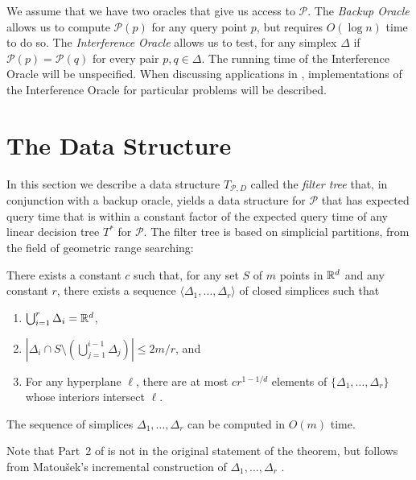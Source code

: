 \documentclass{patmorin}
\begin{document}
We assume that we have two oracles that give us access to $\mathcal{P}$.
The \emph{Backup Oracle} allows us to compute $\mathcal{P}(p)$ for
any query point $p$, but requires $O(\log n)$ time to do so.  The
\emph{Interference Oracle} allows us to test, for any simplex $\Delta$
if $\mathcal{P}(p)=\mathcal{P}(q)$ for every pair $p,q\in\Delta$.
The running time of the Interference Oracle will be unspecified.
When discussing applications in , implementations
of the Interference Oracle for particular problems will be described.

\section{The Data Structure}

In this section we describe a data structure $T_{\mathcal{P},D}$ called
the \emph{filter tree} that, in conjunction with a backup oracle, yields
a data structure for $\mathcal{P}$ that has expected query time that
is within a constant factor of the expected query time of any linear
decision tree $T^*$ for $\mathcal{P}$.  The filter tree is based on
simplicial partitions, from the field of geometric range searching:

\begin{thm}[Matou\v{s}ek 1992]
There exists a constant $c$ such that, for any set $S$ of $m$
points in $\mathbb{R}^d$ and any constant $r$, there exists a sequence
$\langle \Delta_1,\ldots,\Delta_r\rangle$ of closed simplices such that
  \begin{enumerate}
    \item $\bigcup_{i=1}^r \Delta_i = \mathbb{R}^d$,
    \item $\left|\Delta_i \cap S\setminus
    \left(\bigcup_{j=1}^{i-1}\Delta_j\right)\right| \le 2m/r$, and
    \item For any hyperplane $\ell$, there are at most $cr^{1-1/d}$ elements of
  $\{\Delta_1,\ldots,\Delta_r\}$ whose interiors intersect $\ell$.
  \end{enumerate}
  The sequence of simplices $\Delta_1,\ldots,\Delta_r$ can be computed
  in $O(m)$ time.
\end{thm}

Note that Part~2 of  is not in the original
statement of the theorem, but follows from Matou\v{s}ek's incremental
construction of $\Delta_1,\ldots,\Delta_r$ \cite{m92}.
\end{document}
